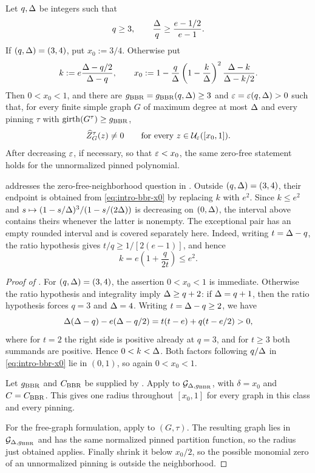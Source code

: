 \begin{theorem}
\label{thm:intro-bbr-interval}
Let \(q,\Delta\) be integers such that
\[
  q\ge3,
  \qquad
  \frac{\Delta}{q}\ge\frac{e-1/2}{e-1}.
\]
If \((q,\Delta)=(3,4)\), put \(x_0:=3/4\).  Otherwise put
\begin{equation}
  k:=e\frac{\Delta-q/2}{\Delta-q},
  \qquad
  x_0:=1-\frac q{\Delta}
       \left(1-\frac{k}{\Delta}\right)^2
       \frac{\Delta-k}{\Delta-k/2}.
  \label{eq:intro-bbr-x0}
\end{equation}
Then \(0<x_0<1\), and there are
\(g_{\rm BBR}=g_{\rm BBR}(q,\Delta)\ge3\) and
\(\varepsilon=\varepsilon(q,\Delta)>0\) such that, for every finite simple graph \(G\)
of maximum degree at most \(\Delta\) and every pinning \(\tau\) with
\(\operatorname{girth}(G^\tau)\ge g_{\rm BBR}\),
\[
  \widehat Z_{G}^{\tau}(z)\ne0
  \qquad\text{for every }z\in\mathcal U_\varepsilon([x_0,1]).
\]
After decreasing \(\varepsilon\), if necessary, so that \(\varepsilon<x_0\), the same
zero-free statement holds for the unnormalized pinned polynomial.
\end{theorem}

 addresses the zero-free-neighborhood question
in \cite[Section~5]{BencsBerrekkalRegts2025Trees}.
Outside \((q,\Delta)=(3,4)\), their endpoint is obtained from
\eqref{eq:intro-bbr-x0} by replacing \(k\) with \(e^2\).
Since \(k\le e^2\) and
\(s\mapsto(1-s/\Delta)^3/(1-s/(2\Delta))\) is decreasing on
\((0,\Delta)\), the interval above contains theirs whenever the latter is
nonempty.  The exceptional pair has an empty rounded interval and is
covered separately here.
Indeed, writing \(t=\Delta-q\), the ratio hypothesis gives
\(t/q\ge1/[2(e-1)]\), and hence
\[
  k=e\left(1+\frac{q}{2t}\right)\le e^2.
\]

\begin{proof}[Proof of ]
For \((q,\Delta)=(3,4)\), the assertion \(0<x_0<1\) is immediate.
Otherwise the ratio hypothesis and integrality imply
\(\Delta\ge q+2\): if \(\Delta=q+1\), then the ratio hypothesis forces
\(q=3\) and \(\Delta=4\).  Writing \(t=\Delta-q\ge2\), we have
\[
  \Delta(\Delta-q)-e(\Delta-q/2)
  =t(t-e)+q(t-e/2)>0,
\]
where for \(t=2\) the right side is positive already at \(q=3\), and
for \(t\ge3\) both summands are positive.  Hence \(0<k<\Delta\).  Both
factors following \(q/\Delta\) in \eqref{eq:intro-bbr-x0} lie in
\((0,1)\), so again \(0<x_0<1\).

Let \(g_{\rm BBR}\) and \(C_{\rm BBR}\) be supplied by
.  Apply
 to
\(\mathcal{G}_{\Delta,g_{\rm BBR}}\), with \(\delta=x_0\) and
\(C=C_{\rm BBR}\).  This gives one radius throughout \([x_0,1]\) for
every graph in this class and every pinning.

For the free-graph formulation, apply
 to \((G,\tau)\).  The resulting graph
lies in \(\mathcal{G}_{\Delta,g_{\rm BBR}}\) and has the same normalized pinned
partition function, so the radius just obtained applies.  Finally shrink
it below \(x_0/2\), so the possible monomial zero of an unnormalized
pinning is outside the neighborhood.
\end{proof}

